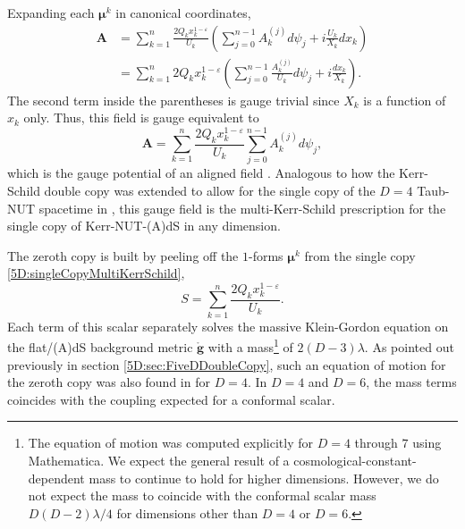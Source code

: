 Expanding each $ \boldsymbol{\mu}^{k}$ in canonical
coordinates,
%
\begin{equation} 
    \begin{split}
        \mathbf{A} &= \sum_{k = 1}^{n} \frac{2Q_{k}x_{k}^{1-\varepsilon}}{U_{k}} \left( \sum_{j = 0}^{n-1}
        A_{k}^{(j)} d\psi_{j} + i \frac{U_{k}}{X_{k}} dx_{k}\right) \\
                   &= \sum_{k = 1}^{n} 2Q_{k}x_{k}^{1-\varepsilon} \left( \sum_{j = 0}^{n-1}
                   \frac{A_{k}^{(j)}}{U_{k}} d\psi_{j} + i \frac{dx_{k}}{X_{k}}\right).
    \end{split}
\end{equation}
%
The second term inside the parentheses is gauge trivial since $X_{k}$ is a function of $x_{k}$ only. Thus, this
field is gauge equivalent to
\begin{equation} 
    \mathbf{A} = \sum_{k = 1}^{n} \frac{2Q_{k}x_{k}^{1-\varepsilon}}{U_{k}} \sum_{j = 0}^{n-1} A_{k}^{(j)}
    d\psi_{j},
\end{equation}
which is the gauge potential of an aligned field \cite{Krtous:2007xg}. Analogous to how the Kerr-Schild double
copy was extended to allow for the single copy of the $D=4$ Taub-NUT spacetime in \cite{Luna:2015paa}, this
gauge field is the multi-Kerr-Schild prescription for the single copy of Kerr-NUT-(A)dS in any dimension. 

The zeroth copy is built by peeling off the $1$-forms $ \boldsymbol{\mu}^{k}$ from the single copy
\eqref{5D:singleCopyMultiKerrSchild},
\begin{equation} \label{5D:zerothCopyMultiKerrSchild} 
    S = \sum_{k = 1}^{n} \frac{2Q_{k}x_{k}^{1-\varepsilon}}{U_{k}}.
\end{equation}
Each term of this scalar separately solves the massive Klein-Gordon equation on the flat/(A)dS background metric
$\mathring{\mathbf{g}}$ with a mass\footnote{The equation of motion was computed explicitly for $D = 4$
through $7$ using Mathematica. We expect the general result of a cosmological-constant-dependent mass to continue
to hold for higher dimensions. However, we do not expect the mass to coincide with the conformal scalar mass
$ D(D-2)\lambda/4$ for dimensions other than $D = 4$ or $D=6$.} of $2(D-3) \lambda$. As pointed out previously in section \ref{5D:sec:FiveDDoubleCopy}, such an equation of
motion for the zeroth copy was also found in \cite{Luna:2015paa} for $D = 4$. In $D = 4$ and $D = 6$, the mass
terms coincides with the coupling expected for a conformal scalar.

